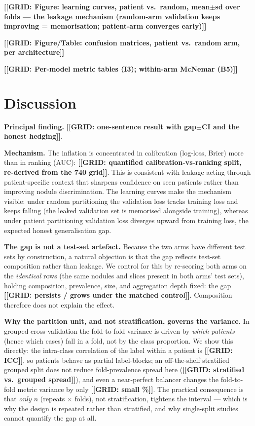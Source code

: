 \documentclass{article}
\newcommand{\gridnum}[1]{{\color{red}\textbf{[[GRID: #1]]}}}
\begin{document}
\gridnum{Figure: learning curves, patient vs.\ random, mean$\pm$sd over folds --- the leakage
mechanism (random-arm validation keeps improving = memorisation; patient-arm converges early)}

\gridnum{Figure/Table: confusion matrices, patient vs.\ random arm, per architecture}

\gridnum{Per-model metric tables (I3); within-arm McNemar (B5)}

\section{Discussion}
\textbf{Principal finding.} \gridnum{one-sentence result with gap$\pm$CI and the honest hedging}.

\textbf{Mechanism.} The inflation is concentrated in calibration (log-loss, Brier) more than in
ranking (AUC): \gridnum{quantified calibration-vs-ranking split, re-derived from the 740 grid}.
This is consistent with leakage acting through patient-specific context that sharpens confidence
on seen patients rather than improving nodule discrimination. The learning curves make the
mechanism visible: under random partitioning the validation loss tracks training loss and keeps
falling (the leaked validation set is memorised alongside training), whereas under patient
partitioning validation loss diverges upward from training loss, the expected honest
generalisation gap.

\textbf{The gap is not a test-set artefact.} Because the two arms have different test sets by
construction, a natural objection is that the gap reflects test-set composition rather than
leakage. We control for this by re-scoring both arms on the \emph{identical} rows (the same nodules
and slices present in both arms' test sets), holding composition, prevalence, size, and aggregation
depth fixed: the gap \gridnum{persists / grows under the matched control}. Composition therefore
does not explain the effect.

\textbf{Why the partition unit, and not stratification, governs the variance.} In grouped
cross-validation the fold-to-fold variance is driven by \emph{which patients} (hence which cases)
fall in a fold, not by the class proportion. We show this directly: the intra-class correlation of
the label within a patient is \gridnum{ICC}, so patients behave as partial label-blocks; an
off-the-shelf stratified grouped split does not reduce fold-prevalence spread here
(\gridnum{stratified vs.\ grouped spread}), and even a near-perfect balancer changes the
fold-to-fold metric variance by only \gridnum{small \%}. The practical consequence is that
\emph{only $n$} (repeats $\times$ folds), not stratification, tightens the interval --- which is
why the design is repeated rather than stratified, and why single-split studies cannot quantify the
gap at all.
\end{document}

